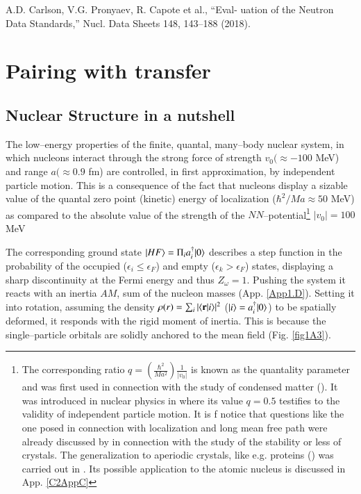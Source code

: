 A.D. Carlson, V.G. Pronyaev, R. Capote et al., “Eval-
uation of the Neutron Data Standards,” Nucl. Data
Sheets 148, 143–188 (2018).\chapter{Pairing with transfer}\label{chapter1}
\section{Nuclear Structure in a nutshell}\label{C1S1}
The low--energy properties of the finite, quantal, many--body nuclear system, in which nucleons interact through the strong force of strength $v_0(\approx -100$ MeV) and range $a(\approx 0.9$ fm) are controlled, in first approximation, by independent particle motion. This is a consequence of the fact that nucleons display a sizable value of the quantal zero point (kinetic) energy of localization ($\hbar^2/Ma\approx 50$ MeV) as compared to the absolute value of the strength of the $NN$--potential\footnote{The corresponding ratio $q=\left(\frac{\hbar^2}{Ma^2}\right)\frac{1}{|v_0|}$ is known as the quantality parameter and was first used in connection with the study of condensed matter (\cite{deBoer:48,deBoer:57,deBoer:48b,Nosanow:76}). It  was introduced in nuclear physics in \cite{Mottelson:02} where its value $q=0.5$ testifies to the validity of independent particle motion. It is f notice that questions like the one posed in connection with localization and long mean free path were already discussed by \cite{Lindemann:10} in connection with the study of the stability or less of crystals. The generalization to aperiodic crystals, like e.g. proteins (\cite{Schrodinger:44}) was carried out in \cite{Stillinger:90}. Its possible application to the atomic nucleus is discussed in App. \ref{C2AppC} } $|v_0|=100$ MeV 

The corresponding ground state $|{HF} \rangle=\Pi_ia^\dagger_i|{0} \rangle$ describes a step function in the probability of the occupied ($\epsilon_i\leq \epsilon_F$) and empty ($\epsilon_k>\epsilon_F$) states, displaying a sharp discontinuity at the Fermi energy and thus $Z_\omega=1$. Pushing the system it reacts with an inertia $AM$, sum of the nucleon masses (App. \ref{App1.D}). Setting it into rotation, assuming the density $\rho(r)=\sum_i|\langle {\mathbf r|i} \rangle|^2$ ($|{i} \rangle=a^\dagger_i|{0} \rangle$) to be spatially deformed, it responds with the rigid moment of inertia. This is because the single--particle orbitals are solidly anchored to the mean field (Fig. \ref{fig1A3}).

